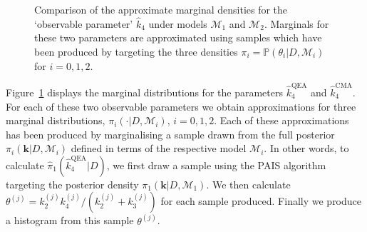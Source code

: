 \documentclass[final]{siamltex}
\begin{document}
\begin{figure}[!htb]
\centering
{}
\caption{Comparison of the approximate marginal densities for the `observable parameter' $\hat{k}_4$ under models $\mathcal{M}_1$ and $\mathcal{M}_2$. Marginals for these two parameters are approximated using samples which have been produced by targeting the three densities $\pi_i = \mathbb{P}(\theta_i|D,\mathcal{M}_i)$ for $i = 0, 1, 2$.}
\label{fig:chem_model_comp}
\end{figure}

Figure~\ref{fig:chem_model_comp} displays the marginal distributions for the parameters $\hat{k}_4^{\text{QEA}}$ and $\hat{k}_4^{\text{CMA}}$. For each of these two observable parameters we obtain approximations for three marginal distributions, $\pi_i(\cdot|D, \mathcal{M}_i)$, $i = 0, 1, 2$. Each of these approximations has been produced by marginalising a sample drawn from the full posterior $\pi_i(\mathbf{k}|D, \mathcal{M}_i)$ defined in terms of the respective model $\mathcal{M}_i$. In other words, to calculate $\hat{\pi}_1(\hat{k}_4^{\text{QEA}}|D)$, we first draw a sample using the PAIS algorithm targeting the posterior density $\pi_1(\mathbf{k}|D,\mathcal{M}_1)$. We then calculate $\theta^{(j)} = k_2^{(j)}k_4^{(j)}/(k_2^{(j)}+k_3^{(j)})$ for each sample produced. Finally we produce a histogram from this sample $\theta^{(j)}$.
\end{document}
